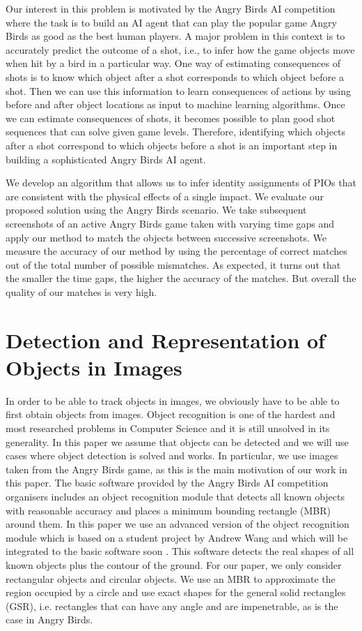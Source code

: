 \documentclass[letterpaper]{article}
\begin{document}
Our interest in this problem is motivated by the Angry Birds AI competition \cite{abCompetition} where the task is to build an AI agent that can play the popular game Angry Birds as good as the best human players. A major problem in this context is to accurately predict the outcome of a shot, i.e., to infer how the game objects move when hit by a bird in a particular way. One way of estimating consequences of shots is to know which object after a shot corresponds to which object before a shot. Then we can use this information to learn consequences of actions by using before and after object locations as input to machine learning algorithms. Once we can estimate consequences of shots, it becomes possible to plan good shot sequences that can solve given game levels. Therefore, identifying which objects after a shot correspond to which objects before a shot is an important step in building a sophisticated Angry Birds AI agent.

We develop an algorithm that allows us to infer identity assignments of PIOs that are consistent with the physical effects of a single impact. We evaluate our proposed solution using the Angry Birds scenario. We take subsequent screenshots of an active Angry Birds game taken with varying time gaps and apply our method to match the objects between successive screenshots. We measure the accuracy of our method by using the percentage of correct matches out of the total number of possible mismatches. As expected, it turns out that the smaller the time gaps, the higher the accuracy of the matches. But overall the quality of our matches is very high.




\section{Detection and Representation of Objects in Images}

In order to be able to track objects in images, we obviously have to be able to first obtain objects from images. Object recognition \cite{belongie2002shape,lowe1999object} is one of the hardest and most researched problems in Computer Science and it is still unsolved in its generality. In this paper we assume that objects can be detected and we will use cases where object detection is solved and works. In particular, we use images taken from the Angry Birds game, as this is the main motivation of our work in this paper. 
The basic software provided by the Angry Birds AI competition organisers includes an object recognition module that detects all known objects with reasonable accuracy and places a minimum bounding rectangle (MBR) around them. In this paper we use an advanced version of the object recognition module which is based on a student project by Andrew Wang and which will be integrated to the basic software soon \cite{andrewwang}. This software detects the real shapes of all known objects plus the contour of the ground. For our paper, we only consider rectangular objects and circular objects. We use an MBR to approximate the region occupied by a circle and use exact shapes for the general solid rectangles (GSR), i.e. rectangles that can have any angle and are impenetrable, as is the case in Angry Birds. 
\end{document}
